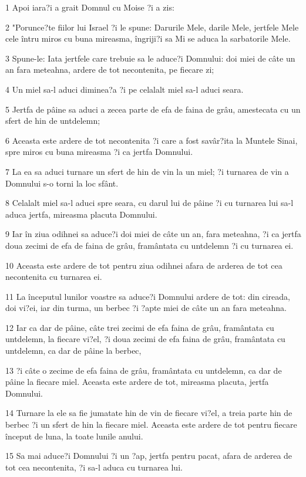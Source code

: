 \par 1 Apoi iara?i a grait Domnul cu Moise ?i a zis:
\par 2 "Porunce?te fiilor lui Israel ?i le spune: Darurile Mele, darile Mele, jertfele Mele cele întru miros cu buna mireasma, îngriji?i sa Mi se aduca la sarbatorile Mele.
\par 3 Spune-le: Iata jertfele care trebuie sa le aduce?i Domnului: doi miei de câte un an fara meteahna, ardere de tot necontenita, pe fiecare zi;
\par 4 Un miel sa-l aduci diminea?a ?i pe celalalt miel sa-l aduci seara.
\par 5 Jertfa de pâine sa aduci a zecea parte de efa de faina de grâu, amestecata cu un sfert de hin de untdelemn;
\par 6 Aceasta este ardere de tot necontenita ?i care a fost savâr?ita la Muntele Sinai, spre miros cu buna mireasma ?i ca jertfa Domnului.
\par 7 La ea sa aduci turnare un sfert de hin de vin la un miel; ?i turnarea de vin a Domnului s-o torni la loc sfânt.
\par 8 Celalalt miel sa-l aduci spre seara, cu darul lui de pâine ?i cu turnarea lui sa-l aduca jertfa, mireasma placuta Domnului.
\par 9 Iar în ziua odihnei sa aduce?i doi miei de câte un an, fara meteahna, ?i ca jertfa doua zecimi de efa de faina de grâu, framântata cu untdelemn ?i cu turnarea ei.
\par 10 Aceasta este ardere de tot pentru ziua odihnei afara de arderea de tot cea necontenita cu turnarea ei.
\par 11 La începutul lunilor voastre sa aduce?i Domnului ardere de tot: din cireada, doi vi?ei, iar din turma, un berbec ?i ?apte miei de câte un an fara meteahna.
\par 12 Iar ca dar de pâine, câte trei zecimi de efa faina de grâu, framântata cu untdelemn, la fiecare vi?el, ?i doua zecimi de efa faina de grâu, framântata cu untdelemn, ca dar de pâine la berbec,
\par 13 ?i câte o zecime de efa faina de grâu, framântata cu untdelemn, ca dar de pâine la fiecare miel. Aceasta este ardere de tot, mireasma placuta, jertfa Domnului.
\par 14 Turnare la ele sa fie jumatate hin de vin de fiecare vi?el, a treia parte hin de berbec ?i un sfert de hin la fiecare miel. Aceasta este ardere de tot pentru fiecare început de luna, la toate lunile anului.
\par 15 Sa mai aduce?i Domnului ?i un ?ap, jertfa pentru pacat, afara de arderea de tot cea necontenita, ?i sa-l aduca cu turnarea lui.
